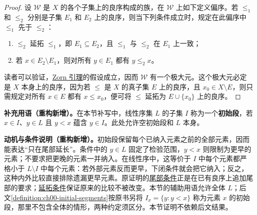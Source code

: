 \documentclass[../../main.tex]{subfiles}%
\begin{document}
\begin{proof}
设 $\mathscr{W}$ 是 $X$ 的各个子集上的良序构成的族，在 $\mathscr{W}$ 上如下定义偏序。若 $\leqslant_1$ 和 $\leqslant_2$ 分别是子集 $E_1$ 和 $E_2$ 上的良序，则当下列条件成立时，规定在此偏序中 $\leqslant_1$ 先于 $\leqslant_2$：
\begin{enumerate}[label=(\roman*),ref=(\roman*)]
\item\label{item:ch00-well-order-extension} $\leqslant_2$ 延拓 $\leqslant_1$，即 $E_1\subseteq E_2$，且 $\leqslant_1$ 与 $\leqslant_2$ 在 $E_1$ 上一致；
\item\label{item:ch00-well-order-end-extension} 若 $x\in E_2\setminus E_1$，则对所有 $y\in E_1$ 都有 $y\leqslant_2 x$。
\end{enumerate}
读者可以验证，\hyperref[lemma:ch00-zorn]{Zorn 引理}的假设成立，因而 $\mathscr{W}$ 有一个极大元。这个极大元必定是 $X$ 本身上的良序，因为若 $\leqslant$ 是 $X$ 的真子集 $E$ 上的良序，且 $x_0\in X\setminus E$，则只需规定对所有 $x\in E$ 都有 $x\leqslant x_0$，便可将 $\leqslant$ 延拓为 $E\cup\{x_0\}$ 上的良序。
\end{proof}
\begin{definition*}\label{definition:ch00-initial-segment-supplement}
\textbf{补充用语（重构新增）。}在本节补写中，线性序集 $L$ 的子集 $I$ 称为一个\textbf{初始段}，若 $x\in I$、$y\in L$ 且 $y<x$ 蕴含 $y\in I$。此处允许空初始段和 $L$ 本身。
\end{definition*}
\begin{remark}
\textbf{动机与条件说明（重构新增）。}初始段保留每个已纳入元素之前的全部元素，因而能表达“只在尾部延长”。条件中的 $y\in L$ 固定了检验范围，$y<x$ 则限制为更早的元素；不要求把更晚的元素一并纳入。在线性序中，这等价于 $I$ 中每个元素都严格小于 $L\setminus I$ 中每个元素：若外部元素反而更早，下闭条件就会把它纳入；反之，这种内外比较直接排除遗漏更早元素。原证明的\hyperref[item:ch00-well-order-end-extension]{尾部条件}正是在已有良序上追加尾部的要求；\hyperref[item:ch00-well-order-extension]{延拓条件}保证原来的比较不被改变。本节的辅助用语允许全体 $L$；后文\cref{definition:ch00-initial-segments}按原书另将 $I_x=\{y:y<x\}$ 称为元素 $x$ 的初始段，那里不包含全体的情形，两种约定须区分。本节证明不依赖后文结果。
\end{remark}
\end{document}
